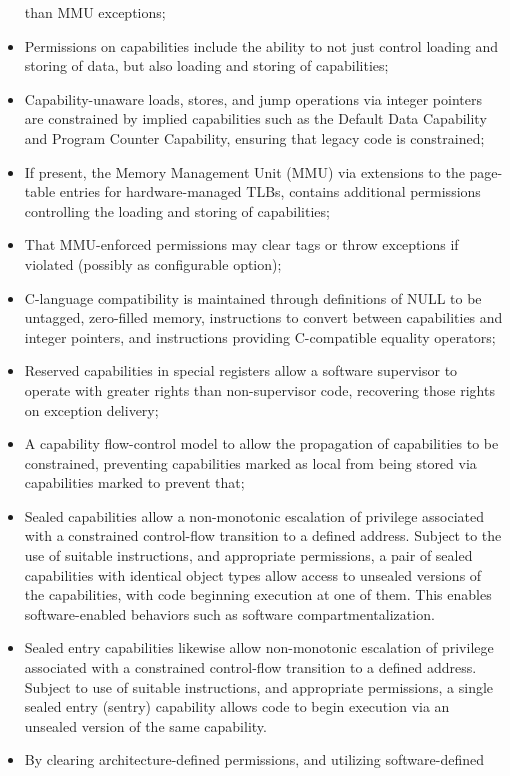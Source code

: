 \begin{itemize}
  than MMU exceptions;
\item Permissions on capabilities include the ability to not just control
  loading and storing of data, but also loading and storing of capabilities;
\item Capability-unaware loads, stores, and jump operations via integer
  pointers are constrained by implied capabilities such as the Default Data
  Capability and Program Counter Capability, ensuring that legacy code is
  constrained;
\item If present, the Memory Management Unit (MMU) via
  extensions to the page-table entries for hardware-managed TLBs, contains
  additional permissions controlling the loading and storing of capabilities;
\item That MMU-enforced permissions may clear tags or throw exceptions if
  violated (possibly as configurable option);
\item C-language compatibility is maintained through definitions of
  NULL to be untagged, zero-filled memory, instructions to convert between
  capabilities and integer pointers, and instructions providing C-compatible
  equality operators;
\item Reserved capabilities in special registers
  allow a software supervisor to operate with greater rights
  than non-supervisor code, recovering those rights on exception delivery;
\item A capability flow-control model to allow the propagation of
  capabilities to be constrained, preventing capabilities marked as local
  from being stored via capabilities marked to prevent that;
\item Sealed capabilities allow a non-monotonic escalation of privilege
  associated with a constrained control-flow transition to a defined address.
  Subject to the use of suitable instructions, and appropriate permissions, a
  pair of sealed capabilities with identical object types allow access to
  unsealed versions of the capabilities, with code beginning execution at one
  of them.
  This enables software-enabled behaviors such as software
  compartmentalization.
\item Sealed entry capabilities likewise allow non-monotonic escalation of
  privilege associated with a constrained control-flow transition to a
  defined address.
  Subject to use of suitable instructions, and appropriate permissions, a
  single sealed entry (sentry) capability allows code to begin execution via
  an unsealed version of the same capability.
\item By clearing architecture-defined permissions, and utilizing software-defined

\end{itemize}
